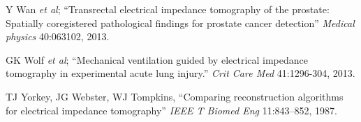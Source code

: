 \documentclass[12pt]{article} \usepackage[margin=3cm]{geometry} \usepackage[margin=20pt,font=small,labelfont=bf]{caption}\def\TBLWIDA{35mm}\def\TBLWIDB{95mm}
\newcommand{\ifmaxthree}[2]{#2 {\em et al}; }
\begin{document}
\begin{thebibliography}{00}
\ifmaxthree{
Y Wan, A Borsic, J Heaney, J Seigne, A Schned, M Baker, S Wason, A Hartov, R Halter
}{
Y Wan
}
``Transrectal electrical impedance tomography of the prostate: Spatially coregistered pathological findings for prostate cancer detection''
{\em Medical physics} 40:063102, 2013.

\ifmaxthree{
GK Wolf, C Gómez-Laberge, JS Rettig, SO Vargas, CD Smallwood, SP Prabhu, SH Vitali, D Zurakowski, JH Arnold
}{
GK Wolf
}
``Mechanical ventilation guided by electrical impedance tomography in experimental acute lung injury.''
{\em Crit Care Med} 41:1296-304, 2013. %

TJ Yorkey, JG Webster, WJ Tompkins,
``Comparing reconstruction algorithms for electrical impedance tomography''
{\em  IEEE T Biomed Eng} 11:843--852, 1987.

\end{thebibliography}
\end{document}

